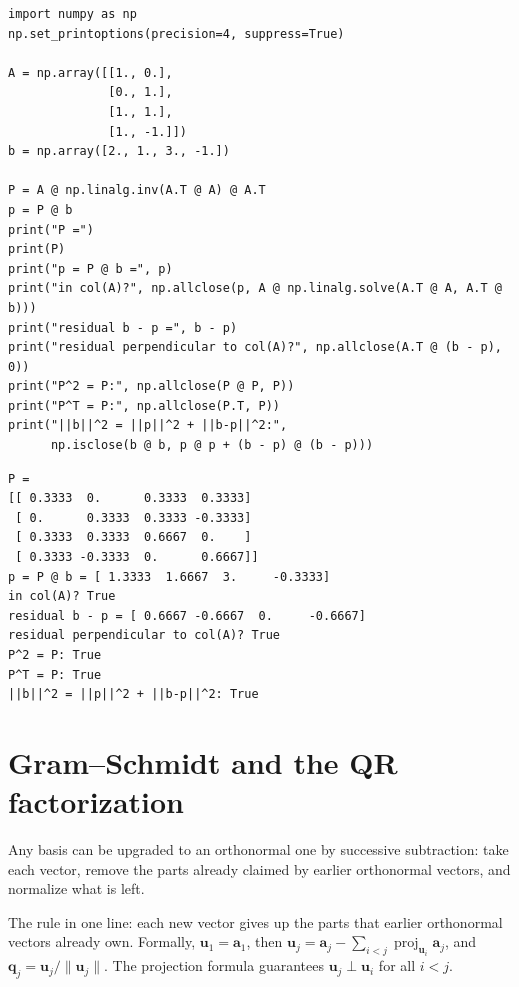 \begin{lstlisting}[caption={\ttfamily code/ch05\_projection\_idempotent.py ---
builds $P=A(A^{T}A)^{-1}A^{T}$ on a $4\times2$ basis, projects, and verifies
every defining property.}]
import numpy as np
np.set_printoptions(precision=4, suppress=True)

A = np.array([[1., 0.],
              [0., 1.],
              [1., 1.],
              [1., -1.]])
b = np.array([2., 1., 3., -1.])

P = A @ np.linalg.inv(A.T @ A) @ A.T
p = P @ b
print("P =")
print(P)
print("p = P @ b =", p)
print("in col(A)?", np.allclose(p, A @ np.linalg.solve(A.T @ A, A.T @ b)))
print("residual b - p =", b - p)
print("residual perpendicular to col(A)?", np.allclose(A.T @ (b - p), 0))
print("P^2 = P:", np.allclose(P @ P, P))
print("P^T = P:", np.allclose(P.T, P))
print("||b||^2 = ||p||^2 + ||b-p||^2:",
      np.isclose(b @ b, p @ p + (b - p) @ (b - p)))
\end{lstlisting}

\begin{lstlisting}[caption={Output of the projection check. Notice all three
signatures of an orthogonal projection at once: lands in $\operatorname{col}(A)$,
perpendicular residual, and $P^2=P$, $P^{T}=P$.}]
P =
[[ 0.3333  0.      0.3333  0.3333]
 [ 0.      0.3333  0.3333 -0.3333]
 [ 0.3333  0.3333  0.6667  0.    ]
 [ 0.3333 -0.3333  0.      0.6667]]
p = P @ b = [ 1.3333  1.6667  3.     -0.3333]
in col(A)? True
residual b - p = [ 0.6667 -0.6667  0.     -0.6667]
residual perpendicular to col(A)? True
P^2 = P: True
P^T = P: True
||b||^2 = ||p||^2 + ||b-p||^2: True
\end{lstlisting}

\section{Gram--Schmidt and the QR factorization}\label{sec:orth-gs}

Any basis can be upgraded to an orthonormal one by successive subtraction:
take each vector, remove the parts already claimed by earlier
orthonormal vectors, and normalize what is left.

The rule in one line: each new vector gives up the parts that earlier
orthonormal vectors already own. Formally, $\mathbf u_1=\mathbf a_1$, then
$\mathbf u_j=\mathbf a_j-\sum_{i<j}\operatorname{proj}_{\mathbf u_i}\mathbf a_j$,
and $\mathbf q_j=\mathbf u_j/\|\mathbf u_j\|$. The projection formula guarantees
$\mathbf u_j\perp\mathbf u_i$ for all $i<j$.

